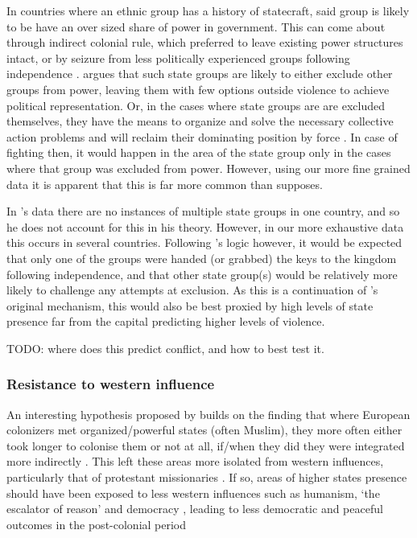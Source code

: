 \documentclass[12pt]{article}
\begin{document}
In countries where an ethnic group has a history of statecraft, said group is
likely to be have an over sized share of power in government. This can come
about through indirect colonial rule, which preferred to leave existing power
structures intact, or by seizure from less politically experienced groups
following independence \citep{Paine2019}. \citet{Paine2019} argues that such
state groups are likely to either exclude other groups from power, leaving them
with few options outside violence to achieve political representation. Or, in
the cases where state groups are are excluded themselves, they have the means to
organize and solve the necessary collective action problems and will reclaim
their dominating position by force \citep{Paine2019}. In case of fighting then,
it would happen in the area of the state group only in the cases where that
group was excluded from power. However, using our more fine grained data it is
apparent that this is far more common than \citet{Paine2019} supposes.


In \citet{Paine2019}'s data there are no instances of multiple state groups in
one country, and so he does not account for this in his theory. However, in our
more exhaustive data this occurs in several countries. Following
\citet{Paine2019}'s logic however, it would be expected that only one of the
groups were handed (or grabbed) the keys to the kingdom following independence,
and that other state group(s) would be relatively more likely to challenge any
attempts at exclusion.  As this is a continuation of \citet{Paine2019}'s
original mechanism, this would also be best proxied by high levels of state
presence far from the capital predicting higher levels of violence.

TODO: where does this predict conflict, and how to best test it. 

\subsubsection{Resistance to western influence}

An interesting hypothesis proposed by \citet{Wishman} builds on the finding that
where European colonizers met organized/powerful states (often Muslim), they
more often either took longer to colonise them or not at all, if/when they did
they were integrated more indirectly \citep{Gerring2011, Hariri2012,
Englebert2000}. This left these areas more isolated from western influences,
particularly that of protestant missionaries \citep{Woodberry2012}. If so, areas
of higher states presence should have been exposed to less western influences
such as humanism, `the escalator of reason' \citep{Pinker2012} and democracy
\citep{Woodberry2012, Hariri2012}, leading to less democratic and peaceful
outcomes in the post-colonial period \citep{Hegre2006}
\end{document}
